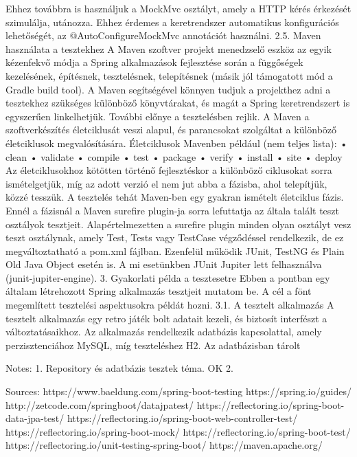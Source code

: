 \documentclass[a4paper, 12 pt]{article}
\begin{document}
Ehhez továbbra is használjuk a MockMvc osztályt, amely a HTTP kérés érkezését szimulálja, utánozza. Ehhez érdemes a keretrendszer automatikus konfigurációs lehetőségét, az @AutoConfigureMockMvc annotációt használni.
2.5. Maven használata a tesztekhez
A Maven szoftver projekt menedzselő eszköz az egyik kézenfekvő módja a Spring alkalmazások fejlesztése során a függőségek kezelésének, építésnek, tesztelésnek, telepítésnek (másik jól támogatott mód a Gradle build tool). A Maven segítségével könnyen tudjuk a projekthez adni a tesztekhez szükséges különböző könyvtárakat, és magát a Spring keretrendszert is egyszerűen linkelhetjük.
További előnye a tesztelésben rejlik. A Maven a szoftverkészítés életciklusát veszi alapul, és parancsokat szolgáltat a különböző életciklusok megvalósítására. Életciklusok Mavenben például (nem teljes lista):
    • clean
    • validate
    • compile
    • test
    • package
    • verify
    • install
    • site
    • deploy
Az életciklusokhoz kötötten történő fejlesztéskor a különböző ciklusokat sorra ismételgetjük, míg az adott verzió el nem jut abba a fázisba, ahol telepítjük, közzé tesszük. A tesztelés tehát Maven-ben egy gyakran ismételt életciklus fázis. Ennél a fázisnál a Maven surefire plugin-ja sorra lefuttatja az általa talált teszt osztályok tesztjeit. Alapértelmezetten a surefire plugin minden olyan osztályt vesz teszt osztálynak, amely Test, Tests vagy TestCase végződéssel rendelkezik, de ez megváltoztatható a pom.xml fájlban. Ezenfelül működik JUnit, TestNG és Plain Old Java Object esetén is. A mi esetünkben JUnit Jupiter lett felhasználva (junit-jupiter-engine).
3. Gyakorlati példa a tesztesetre
Ebben a pontban egy általam létrehozott Spring alkalmazás tesztjeit mutatom be. A cél a fönt megemlített tesztelési aspektusokra példát hozni.
3.1. A tesztelt alkalmazás
A tesztelt alkalmazás egy retro játék bolt adatait kezeli, és biztosít interfészt a változtatásaikhoz. Az alkalmazás rendelkezik adatbázis kapcsolattal, amely perzisztenciához MySQL, míg teszteléshez H2. Az adatbázisban tárolt 







Notes:
1. Repository és adatbázis tesztek téma. OK
2. 












Sources:
https://www.baeldung.com/spring-boot-testing
https://spring.io/guides/
http://zetcode.com/springboot/datajpatest/
https://reflectoring.io/spring-boot-data-jpa-test/
https://reflectoring.io/spring-boot-web-controller-test/
https://reflectoring.io/spring-boot-mock/
https://reflectoring.io/spring-boot-test/
https://reflectoring.io/unit-testing-spring-boot/
https://maven.apache.org/
\end{document}
